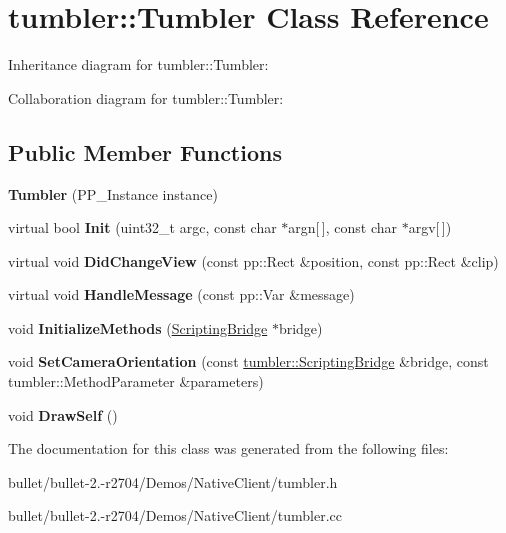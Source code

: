 \hypertarget{classtumbler_1_1_tumbler}{\section{tumbler\+:\+:Tumbler Class Reference}
\label{classtumbler_1_1_tumbler}
}


Inheritance diagram for tumbler\+:\+:Tumbler\+:


Collaboration diagram for tumbler\+:\+:Tumbler\+:
\subsection*{Public Member Functions}
\begin{DoxyCompactItemize}
\item 
\hypertarget{classtumbler_1_1_tumbler_afc6282457030409a4450c49723668a4a}{{\bfseries Tumbler} (P\+P\+\_\+\+Instance instance)}\label{classtumbler_1_1_tumbler_afc6282457030409a4450c49723668a4a}

\item 
\hypertarget{classtumbler_1_1_tumbler_aef1ebea50625efcb315dbf120db396c4}{virtual bool {\bfseries Init} (uint32\+\_\+t argc, const char $\ast$argn\mbox{[}$\,$\mbox{]}, const char $\ast$argv\mbox{[}$\,$\mbox{]})}\label{classtumbler_1_1_tumbler_aef1ebea50625efcb315dbf120db396c4}

\item 
\hypertarget{classtumbler_1_1_tumbler_a940089f93b5b4abf45bfb5155b388178}{virtual void {\bfseries Did\+Change\+View} (const pp\+::\+Rect \&position, const pp\+::\+Rect \&clip)}\label{classtumbler_1_1_tumbler_a940089f93b5b4abf45bfb5155b388178}

\item 
\hypertarget{classtumbler_1_1_tumbler_ad05ccfd15a5ee3a87ceed14b27cb4b2d}{virtual void {\bfseries Handle\+Message} (const pp\+::\+Var \&message)}\label{classtumbler_1_1_tumbler_ad05ccfd15a5ee3a87ceed14b27cb4b2d}

\item 
\hypertarget{classtumbler_1_1_tumbler_a671e02581fa30651d66e5f324d31d147}{void {\bfseries Initialize\+Methods} (\hyperlink{classtumbler_1_1_scripting_bridge}{Scripting\+Bridge} $\ast$bridge)}\label{classtumbler_1_1_tumbler_a671e02581fa30651d66e5f324d31d147}

\item 
\hypertarget{classtumbler_1_1_tumbler_a9083e6d32cf07234a78e490cb5e7ed93}{void {\bfseries Set\+Camera\+Orientation} (const \hyperlink{classtumbler_1_1_scripting_bridge}{tumbler\+::\+Scripting\+Bridge} \&bridge, const tumbler\+::\+Method\+Parameter \&parameters)}\label{classtumbler_1_1_tumbler_a9083e6d32cf07234a78e490cb5e7ed93}

\item 
\hypertarget{classtumbler_1_1_tumbler_a8e7adc740e13cc839ced4cf6fe2788f2}{void {\bfseries Draw\+Self} ()}\label{classtumbler_1_1_tumbler_a8e7adc740e13cc839ced4cf6fe2788f2}

\end{DoxyCompactItemize}


The documentation for this class was generated from the following files\+:\begin{DoxyCompactItemize}
\item 
bullet/bullet-\/2.-\/r2704/\+Demos/\+Native\+Client/tumbler.\+h\item 
bullet/bullet-\/2.-\/r2704/\+Demos/\+Native\+Client/tumbler.\+cc\end{DoxyCompactItemize}
